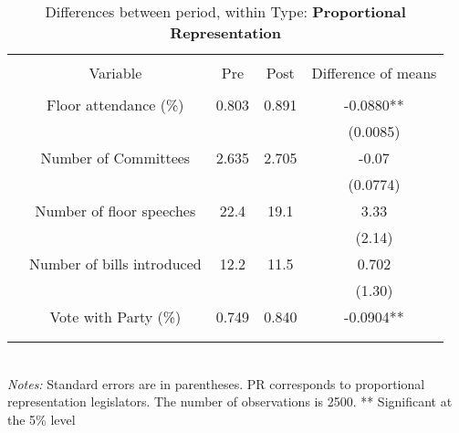 \documentclass{article}
\begin{document}
\begin{table}[!htbp] \centering 
	\caption{Differences between period, within Type: \textbf{Proportional Representation}}
	\begin{tabular}{@{\extracolsep{4pt}} ccccc} 
		\\[-1.8ex]\hline 
		\hline \\[-1.8ex] 
		& Variable & Pre & Post & Difference of means  \\ 
		\hline \\[-1.8ex] 
		& Floor attendance (\%) & 0.803  &  0.891 & -0.0880**   \\ 
		& &   &  & (0.0085)  \\ 
		& Number of Committees   & 2.635   & 2.705  &   -0.07\\ 
		& &   &  &  (0.0774) \\ 
		& Number of floor speeches   &  22.4  &19.1& 3.33  \\ 
		& &   &  &  (2.14) \\ 
		& Number of bills introduced  & 12.2  &11.5  & 0.702 \\ 
		& &   &  & (1.30)  \\ 
		& Vote with Party (\%)   &  0.749 &  0.840   &  -0.0904** \\ 
		& &   &  &   \\ 
		\hline \\[-1.8ex] 
	\end{tabular} 
	\\
	\textit{Notes:} Standard errors are in parentheses. PR corresponds to proportional representation legislators. The number of observations is 2500. ** Significant at the 5\% level
\end{table} 
\end{document}
